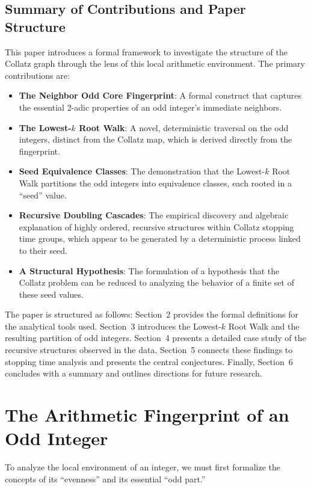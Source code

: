\documentclass[12pt]{article}
\theoremstyle{plain}
\theoremstyle{definition}
\begin{document}
\subsection{Summary of Contributions and Paper Structure}

This paper introduces a formal framework to investigate the structure of the Collatz graph through the lens of this local arithmetic environment. The primary contributions are:
\begin{itemize}
    \item \textbf{The Neighbor Odd Core Fingerprint}: A formal construct that captures the essential 2-adic properties of an odd integer's immediate neighbors.
    \item \textbf{The Lowest-$k$ Root Walk}: A novel, deterministic traversal on the odd integers, distinct from the Collatz map, which is derived directly from the fingerprint.
    \item \textbf{Seed Equivalence Classes}: The demonstration that the Lowest-$k$ Root Walk partitions the odd integers into equivalence classes, each rooted in a ``seed'' value.
    \item \textbf{Recursive Doubling Cascades}: The empirical discovery and algebraic explanation of highly ordered, recursive structures within Collatz stopping time groups, which appear to be generated by a deterministic process linked to their seed.
    \item \textbf{A Structural Hypothesis}: The formulation of a hypothesis that the Collatz problem can be reduced to analyzing the behavior of a finite set of these seed values.
\end{itemize}

The paper is structured as follows: Section~2 provides the formal definitions for the analytical tools used. Section~3 introduces the Lowest-$k$ Root Walk and the resulting partition of odd integers. Section~4 presents a detailed case study of the recursive structures observed in the data. Section~5 connects these findings to stopping time analysis and presents the central conjectures. Finally, Section~6 concludes with a summary and outlines directions for future research.

\section{The Arithmetic Fingerprint of an Odd Integer}

To analyze the local environment of an integer, we must first formalize the concepts of its ``evenness'' and its essential ``odd part.''
\end{document}
